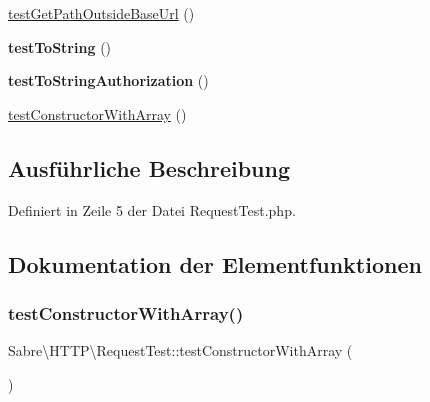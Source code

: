 \begin{DoxyCompactItemize}
\mbox{\hyperlink{class_sabre_1_1_h_t_t_p_1_1_request_test_a8eba0fc804c7e6b462b723cd294f8c9e}{test\+Get\+Path\+Outside\+Base\+Url}} ()
\item 
\mbox{\label{class_sabre_1_1_h_t_t_p_1_1_request_test_a3ea2f1b1f2124ac071194505559ff9ec}} 
{\bfseries test\+To\+String} ()
\item 
\mbox{\label{class_sabre_1_1_h_t_t_p_1_1_request_test_a8c58de5b338669b6eee0f3ccf616cff2}} 
{\bfseries test\+To\+String\+Authorization} ()
\item 
\mbox{\hyperlink{class_sabre_1_1_h_t_t_p_1_1_request_test_a95c728410536a69926c926394a1de174}{test\+Constructor\+With\+Array}} ()
\end{DoxyCompactItemize}


\subsection{Ausführliche Beschreibung}


Definiert in Zeile 5 der Datei Request\+Test.\+php.



\subsection{Dokumentation der Elementfunktionen}
\mbox{\label{class_sabre_1_1_h_t_t_p_1_1_request_test_a95c728410536a69926c926394a1de174}} 
\subsubsection{\texorpdfstring{test\+Constructor\+With\+Array()}{testConstructorWithArray()}}
{\footnotesize\ttfamily Sabre\textbackslash{}\+H\+T\+T\+P\textbackslash{}\+Request\+Test\+::test\+Constructor\+With\+Array (\begin{DoxyParamCaption}{ }\end{DoxyParamCaption})}



